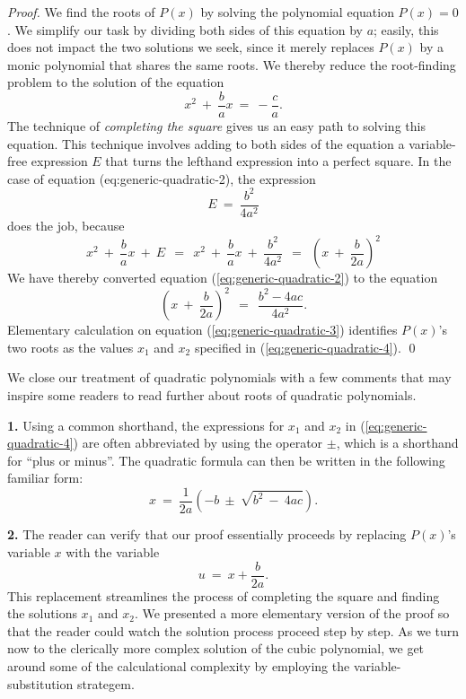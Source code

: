 \begin{proof}
We find the roots of $P(x)$ by solving the polynomial equation $P(x) =
0$.  We simplify our task by dividing both sides of this equation by
$a$; easily, this does not impact the two solutions we seek, since it
merely replaces $P(x)$ by a monic polynomial that shares the same
roots.  We thereby reduce the root-finding problem to the solution of
the equation
\begin{equation}
\label{eq:generic-quadratic-2}
x^2 \ + \ \frac{b}{a} x \ = \ - \frac{c}{a}.
\end{equation}
The technique of {\it completing the square}
 gives us an easy
path to solving this equation.  This technique involves adding to both
sides of the equation a variable-free expression $E$ that turns the
lefthand expression into a perfect square.  In the case of equation
({eq:generic-quadratic-2}), the expression
\[ E \ = \ \frac{b^2}{4a^2} \]
does the job, because
\[
x^2 \ + \ \frac{b}{a} x \ + \ E \ \ = \ \
x^2 \ + \ \frac{b}{a} x \ + \ \frac{b^2}{4a^2}
   \ \ = \ \ \left( x \ + \ \frac{b}{2a} \right)^2
\]
We have thereby converted equation (\ref{eq:generic-quadratic-2}) to
the equation
\begin{equation}
\label{eq:generic-quadratic-3}
\left( x \ + \ \frac{b}{2a} \right)^2
 \ \ = \ \ \frac{b^2 - 4ac}{4a^2}.
\end{equation}
Elementary calculation on equation (\ref{eq:generic-quadratic-3})
identifies $P(x)$'s two roots as the values $x_1$ and $x_2$ specified
in (\ref{eq:generic-quadratic-4}).  \qed
\end{proof}

\bigskip

\noindent
We close our treatment of quadratic polynomials with a few comments
that may inspire some readers to read further about roots of quadratic
polynomials.

{\bf 1.}
Using a common shorthand, the expressions for $x_1$ and $x_2$ in
(\ref{eq:generic-quadratic-4}) are often abbreviated by using the
operator $\pm$, which is a shorthand for ``plus or minus''.
 The quadratic formula can then be written
in the following familiar form:
\[
x \ = \  \frac{1}{2a} \left( -b \ \pm \ \sqrt{b^2 \ - \ 4ac} \right).
\]

\smallskip

{\bf 2.}
The reader can verify that our proof essentially proceeds by
replacing $P(x)$'s variable $x$ with the variable
\[ u \ = \ x + \frac{b}{2a}. \]
This replacement streamlines the process of completing the square and
finding the solutions $x_1$ and $x_2$.  We presented a more elementary
version of the proof so that the reader could watch the solution
process proceed step by step.  As we turn now to the clerically more
complex solution of the cubic polynomial, we get around some of the
calculational complexity by employing the variable-substitution
strategem.

